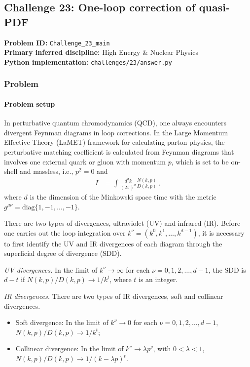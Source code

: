 \subsection[Challenge 23: One-loop correction of quasi-PDF]{Challenge 23: One-loop correction of quasi-PDF}
\textbf{Problem ID:} \texttt{Challenge\_23\_main}\\
\textbf{Primary inferred discipline:} High Energy \& Nuclear Physics\\
\textbf{Python implementation:} \texttt{challenges/23/answer.py}

\subsubsection*{Problem}
\paragraph*{Problem setup}
In perturbative quantum chromodynamics (QCD), one always encounters divergent Feynman diagrams in loop corrections. In the Large Momentum Effective Theory (LaMET) framework for calculating parton physics, the perturbative matching coefficient is calculated from Feynman diagrams that involves one external quark or gluon with momentum $p$, which is set to be on-shell and massless, i.e., $p^2=0$ and
\begin{align}
    I &= \int \frac{d^d k}{(2\pi)^d} \frac{N(k,p)}{D(k,p)} \,,
\end{align}
where $d$ is the dimension of the Minkowski space time with the metric $g^{\mu\nu}=\mbox{diag}\{1,-1,\ldots,-1\}$.

There are two types of divergences, ultraviolet (UV) and infrared (IR). Before one carries out the loop integration over $k^\nu=(k^0, k^1, \ldots, k^{d-1})$, it is necessary to first identify the UV and IR divergences of each diagram through the superficial degree of divergence (SDD).

\emph{UV divergences.} In the limit of $k^\nu \to \infty$ for each $\nu=0,1,2,\ldots,d-1$, the SDD is $d-t$ if $N(k,p)/D(k,p)\rightarrow 1/k^t$, where $t$ is an integer.

\emph{IR divergences.} There are two types of IR divergences, soft and collinear divergences.
\begin{itemize}[leftmargin=*]
\item Soft divergence: In the limit of $k^\nu \to 0$ for each $\nu=0,1,2,\ldots,d-1$, $N(k,p)/D(k,p)\rightarrow 1/k^t$;
\item Collinear divergence: In the limit of $k^\nu \to \lambda p^\nu$, with $0<\lambda< 1$,  $N(k,p)/D(k,p)\rightarrow 1/(k - \lambda p)^t$.
\end{itemize}

